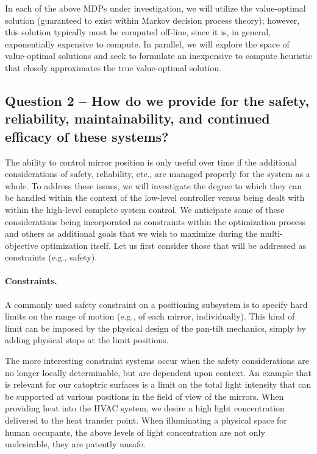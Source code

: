 In each of the above MDPs under investigation, we will utilize the
value-optimal solution (guaranteed to exist within Markov decision process
theory); however, this solution typically must be computed off-line, since
it is, in general, exponentially expensive to compute.  In parallel, we
will explore the space of value-optimal solutions and seek to formulate
an inexpensive to compute heuristic that closely approximates the
true value-optimal solution.

\subsection{Question 2 -- How do we provide for the safety, reliability,
maintainability, and continued efficacy of these systems?}

The ability to control mirror position is only useful over time if the
additional considerations of safety, reliability, etc., are managed
properly for the system as a whole. To address these issues, we will
investigate the degree to which they can be handled within the context
of the low-level controller versus being dealt with within the
high-level complete system control. We anticipate some of these
considerations being incorporated as constraints within the
optimization process and others as additional goals that we wish to
maximize during the multi-objective optimization itself.  Let us first
consider those that will be addressed as constraints (e.g., safety).

\paragraph{Constraints.}
A commonly used safety constraint on a positioning subsystem is to
specify hard limits on the range of motion (e.g., of each mirror, individually).
This kind of limit can be imposed by the physical design of the pan-tilt
mechanics, simply by adding physical stops at the limit positions.

The more interesting constraint systems occur when the safety considerations
are no longer locally determinable, but are dependent upon context.
An example that is relevant for our catoptric surfaces is a limit on
the total light intensity that can be supported at various positions in the
field of view of the mirrors. When providing heat into the HVAC system,
we desire a high light concentration delivered to the heat transfer point.
When illuminating a physical space for human occupants, the above
levels of light concentration are not only undesirable, they are patently
unsafe.

